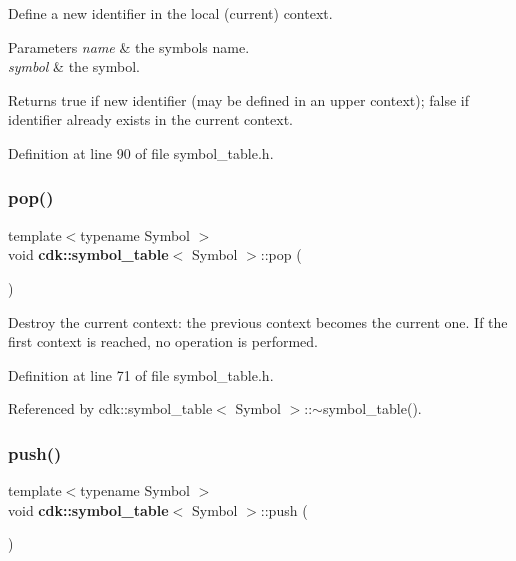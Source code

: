 Define a new identifier in the local (current) context.


\begin{DoxyParams}{Parameters}
{\em name} & the symbol\textquotesingle{}s name. \\
\hline
{\em symbol} & the symbol. \\
\hline
\end{DoxyParams}
\begin{DoxyReturn}{Returns}
{\ttfamily true} if new identifier (may be defined in an upper context); {\ttfamily false} if identifier already exists in the current context. 
\end{DoxyReturn}


Definition at line 90 of file symbol\+\_\+table.\+h.

\mbox{\label{classcdk_1_1symbol__table_a950073cad906b2f40046f386b70d5a84}} 
\subsubsection{pop()}
{\footnotesize\ttfamily template$<$typename Symbol $>$ \\
void \textbf{ cdk\+::symbol\+\_\+table}$<$ Symbol $>$\+::pop (\begin{DoxyParamCaption}{ }\end{DoxyParamCaption})\hspace{0.3cm}{\ttfamily [inline]}}

Destroy the current context\+: the previous context becomes the current one. If the first context is reached, no operation is performed. 

Definition at line 71 of file symbol\+\_\+table.\+h.



Referenced by cdk\+::symbol\+\_\+table$<$ Symbol $>$\+::$\sim$symbol\+\_\+table().

\mbox{\label{classcdk_1_1symbol__table_a7fb69759db941faf1c57631110263988}} 
\subsubsection{push()}
{\footnotesize\ttfamily template$<$typename Symbol $>$ \\
void \textbf{ cdk\+::symbol\+\_\+table}$<$ Symbol $>$\+::push (\begin{DoxyParamCaption}{ }\end{DoxyParamCaption})\hspace{0.3cm}{\ttfamily [inline]}}

